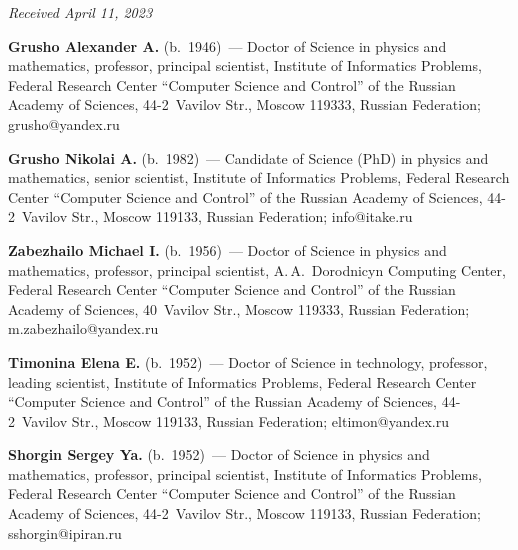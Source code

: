 \vspace*{-6pt}

\hfill{\small\textit{Received April 11, 2023}} 

\vspace*{-12pt}

\Contr


\noindent
\textbf{Grusho Alexander A.} (b.\ 1946)~--- Doctor of Science in physics and mathematics, professor, 
principal scientist, Institute of Informatics Problems, Federal Research Center ``Computer Science and 
Control'' of the Russian Academy of Sciences, 44-2~Vavilov Str., Moscow 119333, Russian 
Federation; \mbox{grusho@yandex.ru}

\vspace*{3pt}

\noindent
\textbf{Grusho Nikolai A.} (b.\ 1982)~--- Candidate of Science (PhD) in physics and mathematics, 
senior scientist, Institute of Informatics Problems, Federal Research Center ``Computer Science and 
Control'' of the Russian Academy of Sciences, 44-2~Vavilov Str., Moscow 119133, Russian 
Federation; \mbox{info@itake.ru}

\vspace*{3pt}

\noindent
\textbf{Zabezhailo Michael I.} (b.\ 1956)~--- Doctor of Science in physics and mathematics, professor, 
principal scientist, A.\,A.~Dorodnicyn Computing Center, Federal Research Center ``Computer 
Science and Control'' of the Russian Academy of Sciences, 40~Vavilov Str., Moscow 119333, Russian 
Federation; \mbox{m.zabezhailo@yandex.ru}

\vspace*{3pt}

\noindent
\textbf{Timonina Elena E.} (b.\ 1952)~--- Doctor of Science in technology, professor, leading scientist, 
Institute of Informatics Problems, Federal Research Center ``Computer Science and Control'' of the 
Russian Academy of Sciences, 44-2~Vavilov Str., Moscow 119133, Russian Federation; 
\mbox{eltimon@yandex.ru}

\vspace*{3pt}

\noindent
\textbf{Shorgin Sergey Ya.} (b.\ 1952)~--- Doctor of Science in physics and mathematics, professor, 
principal scientist, Institute of Informatics Problems, Federal Research Center ``Computer Science and 
Control'' of the Russian Academy of Sciences, 44-2~Vavilov Str., Moscow 119133, Russian 
Federation; \mbox{sshorgin@ipiran.ru}

\label{end\stat}

\renewcommand{\bibname}{\protect\rm Литература} 